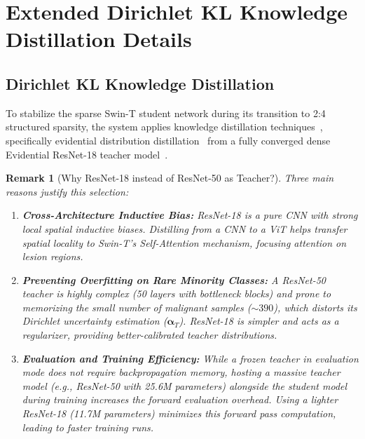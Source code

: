 \documentclass[letterpaper]{article} %
\newtheorem{remark}{Remark}
\begin{document}

\section{Extended Dirichlet KL Knowledge Distillation Details}
\subsection{Dirichlet KL Knowledge Distillation}\label{subsec:distillation}

To stabilize the sparse Swin-T student network during its transition to 2:4 structured sparsity, the system applies knowledge distillation techniques~\cite{hinton2015distilling, gou2021knowledge}, specifically evidential distribution distillation~\cite{malinin2019ensemble} from a fully converged dense Evidential ResNet-18 teacher model~\cite{he2016deep}.

\begin{remark}[Why ResNet-18 instead of ResNet-50 as Teacher?]
Three main reasons justify this selection:
\begin{enumerate}[label=(\roman*)]
    \item \textbf{Cross-Architecture Inductive Bias:} ResNet-18 is a pure CNN with strong local spatial inductive biases. Distilling from a CNN to a ViT helps transfer spatial locality to Swin-T's Self-Attention mechanism, focusing attention on lesion regions.
    \item \textbf{Preventing Overfitting on Rare Minority Classes:} A ResNet-50 teacher is highly complex (50 layers with bottleneck blocks) and prone to memorizing the small number of malignant samples (${\sim}390$), which distorts its Dirichlet uncertainty estimation ($\bm{\alpha}_T$). ResNet-18 is simpler and acts as a regularizer, providing better-calibrated teacher distributions.
    \item \textbf{Evaluation and Training Efficiency:} While a frozen teacher in evaluation mode does not require backpropagation memory, hosting a massive teacher model (e.g., ResNet-50 with 25.6M parameters) alongside the student model during training increases the forward evaluation overhead. Using a lighter ResNet-18 (11.7M parameters) minimizes this forward pass computation, leading to faster training runs.
\end{enumerate}
\end{remark}
\end{document}
